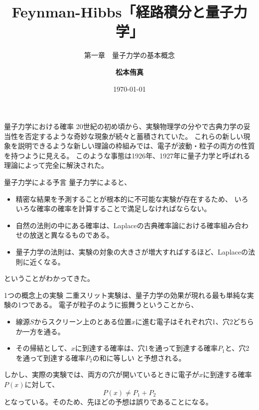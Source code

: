 \documentclass[10pt,aspectratio=169,xcolor=dvipsnames,table,dvipdfmx]{beamer}
\title{Feynman-Hibbs「経路積分と量子力学」}
\subtitle{第一章　量子力学の基本概念}
\author{\textbf{松本侑真}}
\date{\today}
\begin{document}
\maketitle

\begin{frame}{量子力学における確率}
  20世紀の初め頃から、実験物理学の分やで古典力学の妥当性を否定するような奇妙な現象が続々と蓄積されていた。
  これらの新しい現象を説明できるような新しい理論の枠組みでは、電子が波動・粒子の両方の性質を持つように見える。
  このような事態は1926年、1927年に{\color{red}量子力学}と呼ばれる理論によって完全に解決された。
  \begin{block}{量子力学による予言}
      量子力学によると、
    \begin{itemize}
      \item 精密な結果を予測することが根本的に不可能な実験が存在するため、
      いろいろな確率の確率を計算することで満足しなければならない。
      \item 自然の法則の中にある確率は、Laplaceの古典確率論における確率組み合わせの放送と異なるものである。
      \item 量子力学の法則は、実験の対象の大きさが増大すればするほど、Laplaceの法則に近くなる。
    \end{itemize}
      ということがわかってきた。
  \end{block}
\end{frame}

\begin{frame}{1つの概念上の実験}
  二重スリット実験は、量子力学の効果が現れる最も単純な実験の1つである。
  電子が粒子のように振舞うということから、
  \begin{itemize}
    \item 線源$S$からスクリーン上のとある位置$x$に進む電子はそれぞれ穴1、穴2どちらか一方を通る。
    \item その帰結として、$x$に到達する確率は、穴1を通って到達する確率$P_1$と、穴2を通って到達する確率$P_2$の和に等しい
    と予想される。
  \end{itemize}
  しかし、実際の実験では、両方の穴が開いているときに電子が$x$に到達する確率$P(x)$に対して、
  \begin{equation}
    P(x) \neq P_1 + P_2
  \end{equation}
  となっている。そのため、先ほどの予想は誤りであることになる。
\end{frame}
\end{document}
